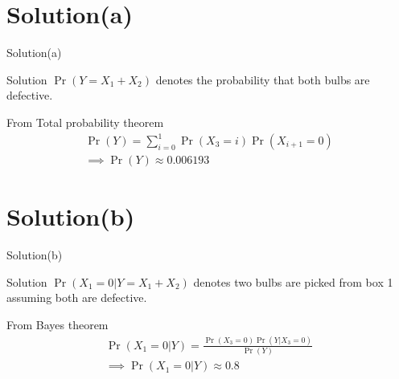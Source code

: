 \documentclass{beamer}
\providecommand{\pr}[1]{\ensuremath{\Pr\left(#1\right)}}
\begin{document}
\section{Solution(a)}
     \begin{frame}{Solution(a)}
     \begin{block}{Solution}
     $\pr{Y=X_1+X_2}$ denotes the probability that both bulbs are defective.\\
     \end{block}
      From Total probability theorem
        \begin{align}
        \pr{Y}=\sum_{i=0}^1 \pr{X_3=i}\pr{X_{i+1}=0}\\
            \implies \boxed{\pr{Y}\approx 0.006193}
        \end{align}
     \end{frame}
     
     
     \section{Solution(b)}
     \begin{frame}{Solution(b)}
     \begin{block}{Solution}
     $\pr{X_1=0|Y=X_1+X_2}$ denotes two bulbs are picked from box 1 assuming both are defective.
     \end{block}
     From Bayes theorem
        \begin{align}
            \pr{X_1=0|Y}=\frac{\pr{X_3=0}\pr{Y|X_3=0}}{\pr{Y}}\\
            \implies \boxed{\pr{X_1=0|Y}\approx0.8}
        \end{align}
     \end{frame}
\end{document}
